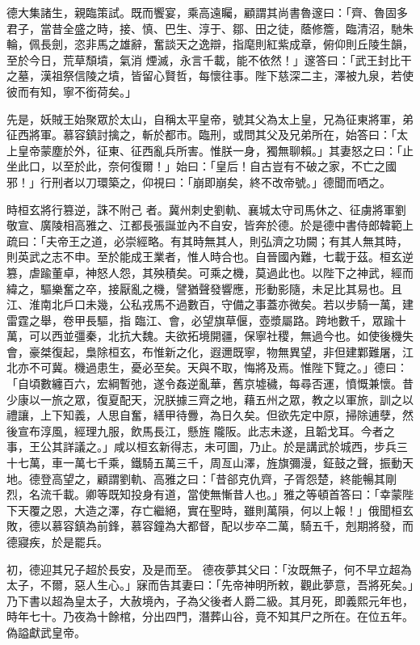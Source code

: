 \begin{pinyinscope}
 德大集諸生，親臨策試。既而饗宴，乘高遠矚，顧謂其尚書魯邃曰：「齊、魯固多君子，當昔全盛之時，接、慎、巴生、淳于、鄒、田之徒，蔭修簷，臨清沼，馳朱輪，佩長劍，恣非馬之雄辭，奮談天之逸辯，指麾則紅紫成章，俯仰則丘陵生韻，至於今日，荒草頹墳，氣消
 煙滅，永言千載，能不依然！」邃答曰：「武王封比干之墓，漢祖祭信陵之墳，皆留心賢哲，每懷往事。陛下慈深二主，澤被九泉，若使彼而有知，寧不銜荷矣。」



 先是，妖賊王始聚眾於太山，自稱太平皇帝，號其父為太上皇，兄為征東將軍，弟征西將軍。慕容鎮討擒之，斬於都市。臨刑，或問其父及兄弟所在，始答曰：「太上皇帝蒙塵於外，征東、征西亂兵所害。惟朕一身，獨無聊賴。」其妻怒之曰：「止坐此口，以至於此，奈何復爾！」始曰：「皇后！自古豈有不破之家，不亡之國邪！」行刑者以刀環築之，仰視曰：「崩即崩矣，終不改帝號。」德聞而哂之。



 時桓玄將行篡逆，誅不附己
 者。冀州刺史劉軌、襄城太守司馬休之、征虜將軍劉敬宣、廣陵相高雅之、江都長張誕並內不自安，皆奔於德。於是德中書侍郎韓範上疏曰：「夫帝王之道，必崇經略。有其時無其人，則弘濟之功闕；有其人無其時，則英武之志不申。至於能成王業者，惟人時合也。自晉國內難，七載于茲。桓玄逆篡，虐踰董卓，神怒人怨，其殃積矣。可乘之機，莫過此也。以陛下之神武，經而緯之，驅樂奮之卒，接厭亂之機，譬猶聲發響應，形動影隨，未足比其易也。且江、淮南北戶口未幾，公私戎馬不過數百，守備之事蓋亦微矣。若以步騎一萬，建雷霆之舉，卷甲長驅，指
 臨江、會，必望旗草偃，壺漿屬路。跨地數千，眾踰十萬，可以西並彊秦，北抗大魏。夫欲拓境開疆，保寧社稷，無過今也。如使後機失會，豪桀復起，梟除桓玄，布惟新之化，遐邇既寧，物無異望，非但建鄴難屠，江北亦不可冀。機過患生，憂必至矣。天與不取，悔將及焉。惟陛下覽之。」德曰：「自頃數纏百六，宏綱暫弛，遂令姦逆亂華，舊京墟穢，每尋否運，憤慨兼懷。昔少康以一旅之眾，復夏配天，況朕據三齊之地，藉五州之眾，教之以軍旅，訓之以禮讓，上下知義，人思自奮，繕甲待釁，為日久矣。但欲先定中原，掃除逋孽，然後宣布淳風，經理九服，飲馬長江，懸旌
 隴阪。此志未遂，且韜戈耳。今者之事，王公其詳議之。」咸以桓玄新得志，未可圖，乃止。於是講武於城西，步兵三十七萬，車一萬七千乘，鐵騎五萬三千，周亙山澤，旌旗彌漫，鉦鼓之聲，振動天地。德登高望之，顧謂劉軌、高雅之曰：「昔郤克仇齊，子胥怨楚，終能暢其剛烈，名流千載。卿等既知投身有道，當使無慚昔人也。」雅之等頓首答曰：「幸蒙陛下天覆之恩，大造之澤，存亡繼絕，實在聖時，雖則萬隕，何以上報！」俄聞桓玄敗，德以慕容鎮為前鋒，慕容鐘為大都督，配以步卒二萬，騎五千，剋期將發，而德寢疾，於是罷兵。



 初，德迎其兄子超於長安，及是而至。
 德夜夢其父曰：「汝既無子，何不早立超為太子，不爾，惡人生心。」寐而告其妻曰：「先帝神明所敕，觀此夢意，吾將死矣。」乃下書以超為皇太子，大赦境內，子為父後者人爵二級。其月死，即義熙元年也，時年七十。乃夜為十餘棺，分出四門，潛葬山谷，竟不知其尸之所在。在位五年。偽謚獻武皇帝。



\end{pinyinscope}